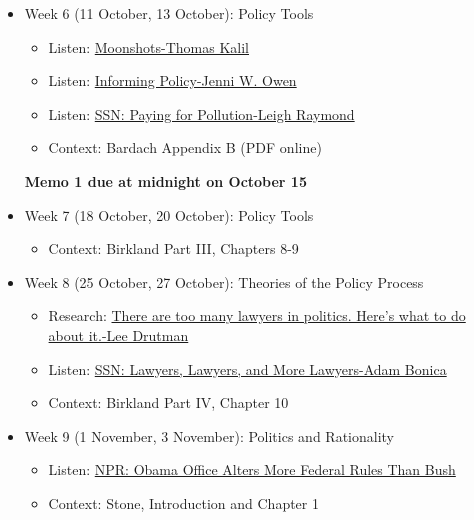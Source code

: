 \documentclass[12pt]{article}
\begin{document}
\begin{itemize}
\item Week 6 (11 October, 13 October): Policy Tools %
\begin{itemize}
\item Listen: \href{https://scholars.org/podcast/moonshots}{Moonshots-Thomas Kalil}
\item Listen: \href{https://scholars.org/podcast/informing-policy}{Informing Policy-Jenni W. Owen}
\item Listen: \href{https://scholars.org/podcast/paying-pollution}{SSN: Paying for Pollution-Leigh Raymond}
\item Context: Bardach Appendix B (PDF online)
\end{itemize}
\textbf{Memo 1 due at midnight on October 15}

\item Week 7 (18 October, 20 October): Policy Tools %
\begin{itemize}
\item Context: Birkland Part III, Chapters 8-9
\end{itemize}

\item Week 8 (25 October, 27 October): Theories of the Policy Process
\begin{itemize}
\item Research: \href{https://www.vox.com/polyarchy/2016/6/30/12068490/too-many-lawyers-politics}{There are too many lawyers in politics. Here’s what to do about it.-Lee Drutman}
\item Listen: \href{https://scholars.org/podcast/lawyers-lawyers-and-more-lawyers}{SSN: Lawyers, Lawyers, and More Lawyers-Adam Bonica}
\item Context: Birkland Part IV, Chapter 10
\end{itemize}

\item Week 9 (1 November, 3 November): Politics and Rationality
\begin{itemize}
\item Listen: \href{https://www.npr.org/2011/11/28/142721675/obama-office-alters-more-federal-rules-than-bush}{NPR: Obama Office Alters More Federal Rules Than Bush}
\item Context: Stone, Introduction and Chapter 1
\end{itemize}


\end{itemize}
\end{document}
